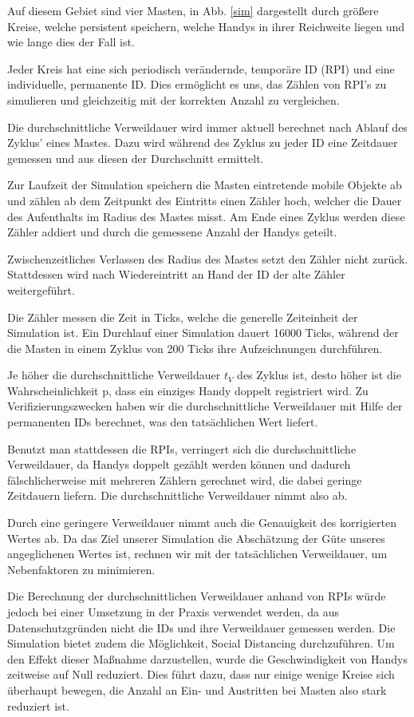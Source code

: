 \documentclass[conference,compsoc]{IEEEtran}
\begin{document}
Auf diesem Gebiet sind vier Masten, in Abb. \ref{sim} dargestellt durch größere Kreise, welche persistent speichern, welche Handys in ihrer Reichweite liegen und wie lange dies der Fall ist.

Jeder Kreis hat eine sich periodisch verändernde, temporäre ID (RPI) und eine individuelle, permanente ID. 
Dies ermöglicht es uns, das Zählen von RPI’s zu simulieren und gleichzeitig mit der korrekten Anzahl zu vergleichen.

Die durchschnittliche Verweildauer wird immer aktuell berechnet nach Ablauf des Zyklus' eines Mastes. 
Dazu wird während des Zyklus zu jeder ID eine Zeitdauer gemessen und aus diesen der Durchschnitt ermittelt.

Zur Laufzeit der Simulation speichern die Masten eintretende mobile Objekte ab und zählen ab dem Zeitpunkt des Eintritts einen Zähler hoch, welcher die Dauer des Aufenthalts im Radius des Mastes misst. 
Am Ende eines Zyklus werden diese Zähler addiert und durch die gemessene Anzahl der Handys geteilt.

Zwischenzeitliches Verlassen des Radius des Mastes setzt den Zähler nicht zurück. 
Stattdessen wird nach Wiedereintritt an Hand der ID der alte Zähler weitergeführt.

Die Zähler messen die Zeit in Ticks, welche die generelle Zeiteinheit der Simulation ist.
Ein Durchlauf einer Simulation dauert 16000 Ticks, während der die Masten in einem Zyklus von 200 Ticks ihre Aufzeichnungen durchführen.

Je höher die durchschnittliche Verweildauer $t_V$ des Zyklus ist, desto höher ist die Wahrscheinlichkeit p, dass ein einziges Handy doppelt registriert wird.
Zu Verifizierungszwecken haben wir die durchschnittliche Verweildauer mit Hilfe der permanenten IDs berechnet, was den tatsächlichen Wert liefert.

Benutzt man stattdessen die RPIs, verringert sich die durchschnittliche Verweildauer, 
da Handys doppelt gezählt werden können und dadurch fälschlicherweise mit mehreren Zählern gerechnet wird, die dabei geringe Zeitdauern liefern. Die durchschnittliche Verweildauer nimmt also ab.

Durch eine geringere Verweildauer nimmt auch die Genauigkeit des korrigierten Wertes ab. 
Da das Ziel unserer Simulation die Abschätzung der Güte unseres angeglichenen Wertes ist, rechnen wir mit der tatsächlichen Verweildauer, um Nebenfaktoren zu minimieren.
 
Die Berechnung der durchschnittlichen Verweildauer anhand von RPIs würde jedoch bei einer Umsetzung in der Praxis verwendet werden, da aus Datenschutzgründen nicht die IDs und ihre Verweildauer gemessen werden.
Die Simulation bietet zudem die Möglichkeit, Social Distancing durchzuführen. 
Um den Effekt dieser Maßnahme darzustellen, wurde die Geschwindigkeit von Handys zeitweise auf Null reduziert. 
Dies führt dazu, dass nur einige wenige Kreise sich überhaupt bewegen, die Anzahl an Ein- und Austritten bei Masten also stark reduziert ist.\\ 
\end{document}
